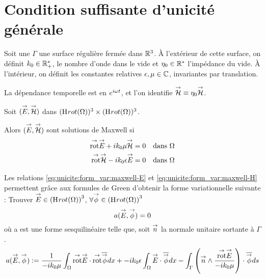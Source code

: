 \section{Condition suffisante d'unicité générale}

  Soit une \(\Gamma\) une surface régulière fermée dans \(\mathbb R^3\).
  À l'extérieur de cette surface, on définit \(k_0 \in \mathbb R_+^*\), le nombre d'onde dans le vide et \(\eta_0 \in \mathbb R^*\) l'impédance du vide.
  À l'intérieur, on définit les constantes relatives \(\epsilon,\mu \in \mathbb C\), invariantes par translation.

  \begin{tcolorbox}
    \centering
    La dépendance temporelle est en \(e^{i\omega t}\), et l'on identifie \({\overset{\rightarrow}{\mathcal{H}}} \equiv \eta _0 {\overset{\rightarrow}{\mathcal{H}}}\).
  \end{tcolorbox}

  Soit \(({\overset{\rightarrow}{E}},{\overset{\rightarrow}{\mathcal{H}}})\) dans \((\mathrm{H}_\mathrm{{}}{rot}(\Omega))^3 \times (\mathrm{H}_\mathrm{{}}{rot}(\Omega))^3\).

  Alors \(({\overset{\rightarrow}{E}},{\overset{\rightarrow}{\mathcal{H}}})\) sont solutions de Maxwell si
  \begin{align}
    \label{eq:unicite:form_var:maxwell-E}
    \trot \vE + ik_0 \mu \vH &= 0 && \text{dans \(\OO\)}
    \\\label{eq:unicite:form_var:maxwell-H}
    \trot \vH - ik_0\eps \vE &= 0 && \text{dans \(\OO\)}
  \end{align}

  Les relations \eqref{eq:unicite:form_var:maxwell-E} et \eqref{eq:unicite:form_var:maxwell-H} permettent grâce aux formules de Green d'obtenir la forme variationnelle suivante :
  Trouver \({\overset{\rightarrow}{E}} \in \left(\mathrm{H}_\mathrm{{}}{rot}(\Omega)\right)^3\), \(\forall {\overset{\rightarrow}{\phi}} \in \left(\mathrm{H}_\mathrm{{}}{rot}(\Omega)\right)^3\)
  \[
    a({\overset{\rightarrow}{E}},{\overset{\rightarrow}{\phi}}) = 0
  \]
  où a est une forme sesquilinéaire telle que, soit \({\overset{\rightarrow}{n}}\) la normale unitaire sortante à \(\Gamma\).
  \begin{align*}
    a({\overset{\rightarrow}{E}},{\overset{\rightarrow}{\phi}}) &:=  \dfrac{1}{-ik_0\mu} \int_\Omega {{\overset{\rightarrow}{\operatorname{rot}}}} {\overset{\rightarrow}{E}} \cdot {{\overset{\rightarrow}{\operatorname{rot}}}} {\overline{{\overset{\rightarrow}{\phi}}}} dx + -ik_0\epsilon\int_\Omega{\overset{\rightarrow}{E}}\cdot{\overline{{\overset{\rightarrow}{\phi}}}} dx
     - \int_\Gamma \left({\overset{\rightarrow}{n}} \wedge \dfrac{{{\overset{\rightarrow}{\operatorname{rot}}}} {\overset{\rightarrow}{E}}}{-ik_0\mu}\right) \cdot {\overline{{\overset{\rightarrow}{\phi}}}} ds \\
   \end{align*}

